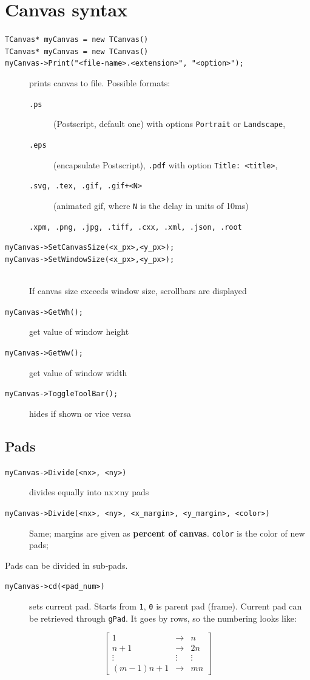 \documentclass[10pt, twoside]{article}
\newcommand{\ttt}[1]{\colorbox{boxgray}{\texttt{#1}}}
\begin{document}
\section{Canvas syntax}
\begin{description}
\item[\ttt{TCanvas* myCanvas = new TCanvas()}]
\item[\ttt{TCanvas* myCanvas = new TCanvas()}]
\item[\ttt{myCanvas->Print("<file-name>.<extension>", "<option>");}] prints canvas to file. Possible formats: 
\begin{description}
\item[\ttt{.ps}] (Postscript, default one) with options \ttt{Portrait} or \ttt{Landscape}, \item[\ttt{.eps}] (encapsulate Postscript), \ttt{.pdf} with option \ttt{Title: <title>}, \item[\ttt{.svg, .tex, .gif, .gif+<N>}] (animated gif, where \ttt{N} is the delay in units of 10ms)
\item[\ttt{.xpm, .png, .jpg, .tiff, .cxx, .xml, .json, .root}]
\end{description}

\item[\ttt{myCanvas->SetCanvasSize(<x\_px>,<y\_px>);}]
\item[\ttt{myCanvas->SetWindowSize(<x\_px>,<y\_px>);}]{}\,\\
If canvas size exceeds window size, scrollbars are displayed
\item[\ttt{myCanvas->GetWh();}] get value of window height
\item[\ttt{myCanvas->GetWw();}] get value of window width
\item[\ttt{myCanvas->ToggleToolBar();}] hides if shown or vice versa
\end{description}
\subsection*{Pads}
\begin{description}
\item[\ttt{myCanvas->Divide(<nx>, <ny>)}] divides equally into nx$\times$ny pads 
\item[\ttt{myCanvas->Divide(<nx>, <ny>, <x\_margin>, <y\_margin>, <color>)}] Same; margins are given as \textbf{percent of canvas}. \ttt{color} is the color of new pads; 
\end{description}
Pads can be divided in sub-pads.
\begin{description}
\item[\ttt{myCanvas->cd(<pad\_num>)}] sets current pad. Starts from \ttt{1}, \ttt{0} is parent pad (frame). Current pad can be retrieved through \ttt{gPad}. It goes by rows, so the numbering looks like:
\end{description}
\[\begin{bmatrix}
1 & \rightarrow &  n \\
n+1 & \rightarrow & 2n \\
\vdots & \vdots & \vdots\\
(m-1)n + 1 & \rightarrow & mn
\end{bmatrix}\]
\newpage
\end{document}
